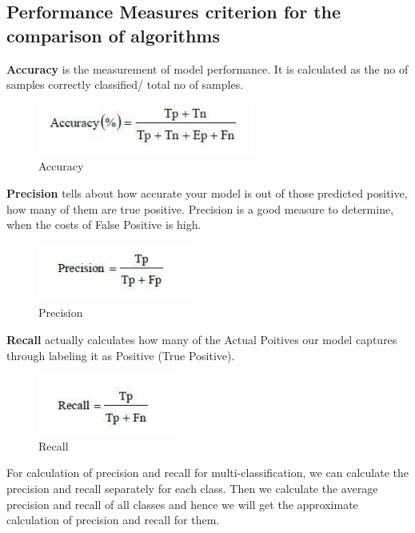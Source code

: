 \subsection{Performance Measures criterion for the comparison of algorithms}
{\bf Accuracy} is the measurement of model performance. It is calculated as the no of samples correctly classified/ total no of samples.
 
\begin{figure}[h]
  		\centering
    		\includegraphics{./Figures/accuracy}
\caption{Accuracy}
\label{fig:5}
 		\end{figure}

{\bf Precision} tells about how accurate your model is out of those predicted positive, how many of them are true positive. Precision is a good measure to determine, when the costs of False Positive is high.

\begin{figure}[h]
  		\centering
    		\includegraphics{./Figures/precision}
\caption{Precision}
\label{fig:6}
 		\end{figure}
 
{\bf Recall} actually calculates how many of the Actual Poitives our model captures through labeling it as Positive (True Positive).

\begin{figure}[h]
  		\centering
    		\includegraphics{./Figures/recall}
\caption{Recall}
\label{fig:7}
 		\end{figure}

For calculation of precision and recall for multi-classification, we can calculate the precision and recall separately for each class.
Then we calculate the average precision and recall of all classes and hence we will get the approximate calculation of precision and recall for them. 